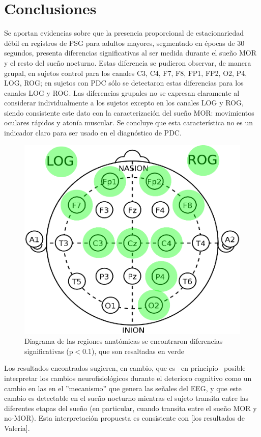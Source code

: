 

\section{Conclusiones}

Se aportan evidencias sobre que la presencia proporcional de estacionariedad d\'ebil en registros 
de PSG para adultos mayores, segmentado en \'epocas de 30 segundos, 
presenta diferencias significativas al ser medida durante el sue\~no MOR y el resto del sue\~no
nocturno. Estas diferencia se pudieron observar, de manera grupal, 
en sujetos control para los canales 
C3, C4, F7, F8, FP1, FP2, O2, P4, LOG, ROG; en sujetos con PDC s\'olo se detectaron estas 
diferencias para los canales LOG y ROG.
Las diferencias grupales no se expresan claramente al considerar individualmente
a los sujetos excepto en los canales LOG y ROG, siendo consistente este dato con la 
caracterizaci\'on del sue\~no MOR: movimientos oculares r\'apidos y aton\'ia muscular.
Se concluye que esta caracter\'istica no es un indicador claro para ser usado
en el diagn\'ostico de PDC.

\begin{figure}
\centering
\includegraphics[width=0.4\linewidth]{cabecita.pdf}
\caption{Diagrama de las regiones anat\'omicas se encontraron diferencias significativas
(p$<$0.1), que son resaltadas en verde}
\end{figure}

Los resultados encontrados sugieren, en cambio, que es --en principio-- posible interpretar los
cambios neurofisiol\'ogicos durante el deterioro cognitivo como un cambio en las 
en el ''mecanismo'' que genera las se\~nales del EEG, y que este cambio es detectable en el 
sue\~no nocturno mientras el sujeto transita entre las diferentes etapas del sue\~no 
(en particular, cuando transita entre el sue\~no MOR y no-MOR).
Esta interpretaci\'on propuesta es consistente con [los resultados de Valeria].

